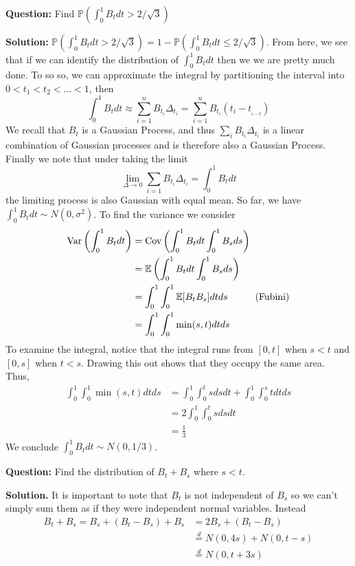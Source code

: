 \documentclass{article}
\begin{document}
\begin{tcolorbox}[colframe=black,colback=gray!5,boxrule=0.5pt]
\textbf{Question:} Find $\mathbb{P}(\int_0^1B_tdt > 2/\sqrt{3})$ \cite{Fima}
\end{tcolorbox}
\textbf{Solution:} $\mathbb{P}(\int_0^1B_tdt > 2/\sqrt{3}) = 1-\mathbb{P}(\int_0^1B_tdt \leq 2/\sqrt{3})$. From here, we see that if we can identify the distribution of $\int_{0}^{1}B_tdt$ then we we are pretty much done. To so so, we can approximate the integral by partitioning the interval into $0<t_1<t_2<\dots<1$, then
$$\int_{0}^{1}B_t dt \approx \sum_{i=1}^{n}B_{t_i}\Delta_{t_i} = \sum_{i=1}^{n}B_{t_i}(t_{i}-t_{_{i-t}})$$
We recall that $B_t$ is a Gaussian Process, and thus $\sum_iB_{t_i}\Delta_{t_i}$ is a linear combination of Gaussian processes and is therefore also a Gaussian Process. Finally we note that under taking the limit 
$$\lim_{\Delta\to0}\sum_{i=1}B_{t_i}\Delta_{t_i} = \int_{0}^{1}B_t dt$$
the limiting process is also Gaussian with equal mean. So far, we have $\int_{0}^{1}B_tdt\sim N(0, \sigma^2)$. To find the variance we consider
\begin{align*}
    \text{Var}\left(\int_{0}^{1}B_tdt\right) &= \text{Cov}\left(\int_{0}^{1}B_tdt\int_{0}^{1}B_sds\right) \\
    &= \mathbb{E}\left(\int_{0}^{1}B_tdt\int_{0}^{1}B_sds\right) \\
    &=\int_{0}^{1}\int_{0}^{1}\mathbb{E}[B_t B_s]dtds \hspace{10mm} \text{(Fubini)}\\
    &= \int_{0}^{1}\int_{0}^{1}\min(s, t)dtds
\end{align*}
To examine the integral, notice that the integral runs from $[0,t]$ when $s<t$ and $[0,s]$ when $t<s$. Drawing this out shows that they occupy the same area. Thus, 
\begin{align*}
    \int_{0}^{1}\int_{0}^{1}\min(s, t)dtds &= \int_{0}^{1}\int_{0}^{t}sdsdt + \int_{0}^{1}\int_{0}^{s}tdtds \\
    &= 2\int_{0}^{1}\int_{0}^{t}sdsdt \\
    &= \frac{1}{3}
\end{align*}
We conclude $\int_{0}^{1}B_tdt\sim N(0, 1/3)$.

\vspace{2mm}

\begin{tcolorbox}[colframe=black,colback=gray!5,boxrule=0.5pt]
\textbf{Question:} Find the distribution of $B_t + B_s$ where $s < t$.
\end{tcolorbox}
\textbf{Solution.} It is important to note that $B_t$ is not independent of $B_s$ so we can't simply sum them as if they were independent normal variables. Instead 
\begin{align*}
    B_t + B_s = B_s + (B_t - B_s) + B_s &= 2B_s + (B_t-B_s) \\
    &\stackrel{d}{=}N(0, 4s) + N(0, t-s) \\
    &\stackrel{d}{=}N(0, t + 3s)
\end{align*}
\end{document}
